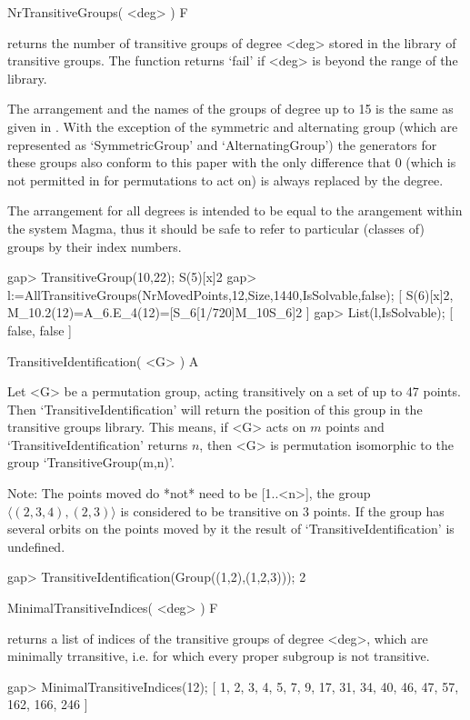 \>NrTransitiveGroups( <deg> ) F

returns the number of transitive groups of degree <deg> stored in the
library of transitive groups. The function returns `fail' if <deg> is
beyond the range of the library.

The arrangement and the names of the groups of degree up to 15 is the same
as given in \cite{ConwayHulpkeMcKay98}. With the exception of the symmetric
and alternating group (which are represented as `SymmetricGroup' and
`AlternatingGroup') the generators for these groups also conform to this
paper with the only difference that 0 (which is not permitted in {\GAP} for
permutations to act on) is always replaced by the degree.

The arrangement for all degrees is intended to be equal to the arangement
within the system Magma, thus it should be safe to refer to particular
(classes of) groups by their index numbers.

\beginexample
gap> TransitiveGroup(10,22);
S(5)[x]2
gap> l:=AllTransitiveGroups(NrMovedPoints,12,Size,1440,IsSolvable,false);
[ S(6)[x]2, M_10.2(12)=A_6.E_4(12)=[S_6[1/720]{M_10}S_6]2 ]
gap> List(l,IsSolvable);
[ false, false ]
\endexample

\>TransitiveIdentification( <G> ) A

Let <G> be a permutation group, acting transitively on a set  of up to 47
points.  Then `TransitiveIdentification' will return the position of this
group in the transitive  groups library.  This means,  if <G> acts on
$m$ points and    `TransitiveIdentification'  returns $n$,  then <G>   is
permutation isomorphic to the group `TransitiveGroup(m,n)'.

Note: The points moved do *not* need to be [1..<n>], the group
$\langle (2,3,4),(2,3)\rangle$ is considered to be transitive on 3
points. If the group has several orbits on the points moved by it the
result of `TransitiveIdentification' is undefined.


\beginexample
gap> TransitiveIdentification(Group((1,2),(1,2,3)));
2
\endexample

\>MinimalTransitiveIndices( <deg> ) F

returns a list of indices of the transitive groups of degree <deg>, which
are minimally trransitive, i.e. for which every proper subgroup is not
transitive.

\beginexample
gap> MinimalTransitiveIndices(12);
[ 1, 2, 3, 4, 5, 7, 9, 17, 31, 34, 40, 46, 47, 57, 162, 166, 246 ]
\endexample


